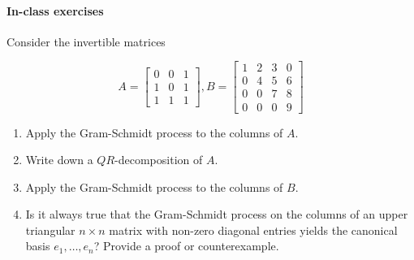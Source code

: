 \documentclass{article}
\begin{document}
\paragraph{In-class exercises} Consider the invertible matrices

$$
A = \begin{bmatrix}
    0 & 0 & 1 \\
    1 & 0 & 1 \\
    1 & 1 & 1
\end{bmatrix}, B = \begin{bmatrix}
    1 & 2 & 3 & 0 \\
    0 & 4 & 5 & 6 \\
    0 & 0 & 7 & 8 \\
    0 & 0 & 0 & 9
\end{bmatrix}
$$

\begin{enumerate}
    \item Apply the Gram-Schmidt process to the columns of $A$.
    \item Write down a $QR$-decomposition of $A$.
    \item Apply the Gram-Schmidt process to the columns of $B$.
    \item Is it always true that the Gram-Schmidt process on the columns of an upper triangular $n \times n$ matrix with non-zero diagonal entries yields the canonical basis $e_1,\dots,e_n$? Provide a proof or counterexample.
\end{enumerate}
\end{document}
